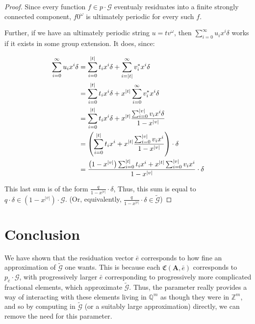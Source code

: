 \documentclass{article}
\newcommand{\G}{\mathcal{G}}
\newcommand{\C}{\mathfrak{C}(\Am,\e)}
\newcommand{\Z}{\mathbb{Z}}
\newcommand{\Q}{\mathbb{Q}}
\newcommand{\2}{\textbf{2}}
\newcommand{\Am}{\textbf{A}}
\newcommand{\e}{\bar{e}}
\theoremstyle{definition}
\begin{document}
\begin{proof}
  Since every function $f \in p \cdot \G$ eventualy residuates into a finite
  strongly connected component, $f 0^\omega$ is ultimately periodic for
  every such $f$.

  Further, if we have an ultimately periodic string $u = tv^{\omega}$, then
  $\sum_{i=0}^{\infty} u_i x^i \delta$ works if it exists in some group 
  extension. It does, since:

  \begin{align*}
    \sum_{i=0}^{\infty} u_i x^i \delta 
    &= \sum_{i=0}^{|t|} t_i x^i \delta 
        + \sum_{i=|t|}^{\infty} v^*_i x^i \delta\\
    &= \sum_{i=0}^{|t|} t_i x^i \delta 
        + x^{|t|} \sum_{i=0}^{\infty} v^*_i x^i \delta\\
    &= \sum_{i=0}^{|t|} t_i x^i \delta 
         + x^{|t|} \frac{\sum_{i=0}^{|v|} v_i x^i \delta}{1 - x^{|v|}}\\
    &= \left ( 
        \sum_{i=0}^{|t|} t_i x^i
        + x^{|t|} \frac{\sum_{i=0}^{|v|} v_i x^i}{1 - x^{|v|}}
       \right ) \cdot \delta\\
    &= \frac%
        {%
          \left ( 1 - x^{|v|} \right ) \sum_{i=0}^{|t|} t_i x^i + 
          x^{|t|} \sum_{i=0}^{|v|} v_i x^i
        }
        {1 - x^{|v|}}
       \cdot \delta\\
  \end{align*}
   
  This last sum is of the form $\frac{q}{1 - x^{|v|}} \cdot \delta$, 
  Thus, this sum is equal to $q \cdot \delta \in (1 - x^{|v|}) \cdot \G$.
  (Or, equivalently, $\frac{q}{1 - x^{|v|}} \cdot \delta \in \widetilde{\G}$)
\end{proof}

\newpage
\section{Conclusion}
We have shown that the residuation vector $\e$ corresponds to how fine an
approximation of $\widetilde{\G}$ one wants. This is because each $\C$ 
corresponds to $p_{\e} \cdot \G$, with progressively larger $\e$ 
corresponding to progressively more complicated fractional elements, which
approximate $\widetilde{\G}$. Thus, the parameter really provides a way of
interacting with these elements living in $\Q^m$ as though they were in $\Z^m$,
and so by computing in $\widetilde{\G}$ (or a suitably large approximation) 
directly, we can remove the need for this parameter.
\end{document}
